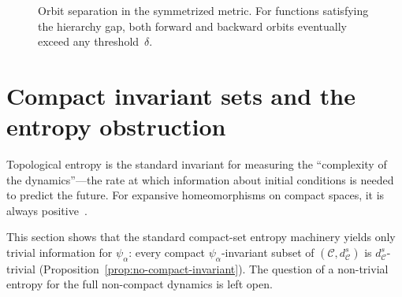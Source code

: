 \documentclass[11pt,a4paper]{article}
\theoremstyle{plain}
\theoremstyle{definition}
\newcommand{\C}{\mathcal{C}}
\begin{document}
\begin{figure}[H]
\centering
{}
\caption{Orbit separation in the symmetrized metric.  For functions
satisfying the hierarchy gap, both forward and backward orbits
eventually exceed any threshold~$\delta$.}
\label{fig:hierarchy}
\end{figure}


\section{Compact invariant sets and the entropy obstruction}
\label{sec:entropy}

Topological entropy is the standard invariant for measuring the
``complexity of the dynamics''---the rate at which information
about initial conditions is needed to predict the future.  For
expansive homeomorphisms on compact spaces, it is always
positive~\cite{bowen1975}.

This section shows that the standard compact-set entropy
machinery yields only trivial information for $\psi_\alpha$:
every compact $\psi_\alpha$-invariant subset of $(\C,d_\C^s)$
is $d_\C^s$-trivial (Proposition~\ref{prop:no-compact-invariant}).
The question of a non-trivial entropy for the full non-compact
dynamics is left open.
\end{document}
